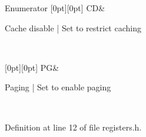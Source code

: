 \begin{DoxyEnumFields}{Enumerator}
[0pt][0pt]{}\mbox{\label{namespace_c_r0_aca53d8161d60c86788386fa6db06e7aaa4154f3b5cb906ec0bfab20c87e8a7d84}} 
CD&
\begin{DoxyPre}Cache disable       | Set to restrict caching                                               \end{DoxyPre}
 \\
\hline

[0pt][0pt]{}\mbox{\label{namespace_c_r0_aca53d8161d60c86788386fa6db06e7aaa674029f08e40b913896b27f5cb5e1ec8}} 
PG&
\begin{DoxyPre}Paging              | Set to enable paging                                                  \end{DoxyPre}
 \\
\hline

\end{DoxyEnumFields}


Definition at line 12 of file registers.\+h.

